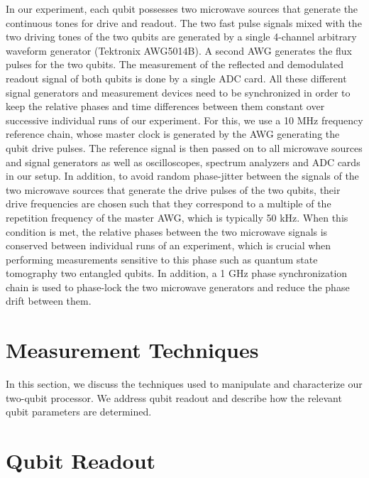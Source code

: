 In our experiment, each qubit possesses two microwave sources that generate the continuous tones for drive and readout. The two fast pulse signals mixed with the two driving tones of the two qubits are generated by a single 4-channel arbitrary waveform generator (Tektronix AWG5014B). A second AWG generates the flux pulses for the two qubits. The measurement of the reflected and demodulated readout signal of both qubits is done by a single ADC card. All these different signal generators and measurement devices need to be synchronized in order to keep the relative phases and time differences between them constant over successive individual runs of our experiment. For this, we use a 10 MHz frequency reference chain, whose master clock is generated by the AWG generating the qubit drive pulses. The reference signal is then passed on to all microwave sources and signal generators as well as oscilloscopes, spectrum analyzers and ADC cards in our setup. In addition, to avoid random phase-jitter between the signals of the two microwave sources that generate the drive pulses of the two qubits, their drive frequencies are chosen such that they correspond to a multiple of the repetition frequency of the master AWG, which is typically 50 kHz. When this condition is met, the relative phases between the two microwave signals is conserved between individual runs of an experiment, which is crucial when performing measurements sensitive to this phase such as quantum state tomography two entangled qubits. In addition, a 1 GHz phase synchronization chain is used to phase-lock the two microwave generators and reduce the phase drift between them.

\section{Measurement Techniques}

In this section, we discuss the techniques used to manipulate and characterize our two-qubit processor. We address qubit readout and describe how the relevant qubit parameters are determined.

\section{Qubit Readout} \label{section:qubit_readout}

